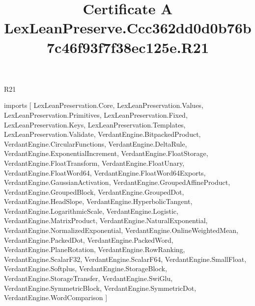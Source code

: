 \begin{lexlean}{R21}
\title{Certificate A LexLeanPreserve.Ccc362dd0d0b76b7c46f93f7f38ec125e.R21}
\begin{coremodule}
imports [
  LexLeanPreservation.Core,
  LexLeanPreservation.Values,
  LexLeanPreservation.Primitives,
  LexLeanPreservation.Fixed,
  LexLeanPreservation.Keys,
  LexLeanPreservation.Templates,
  LexLeanPreservation.Validate,
  VerdantEngine.BitpackedProduct,
  VerdantEngine.CircularFunctions,
  VerdantEngine.DeltaRule,
  VerdantEngine.ExponentialIncrement,
  VerdantEngine.FloatStorage,
  VerdantEngine.FloatTransform,
  VerdantEngine.FloatUnary,
  VerdantEngine.FloatWord64,
  VerdantEngine.FloatWord64Exports,
  VerdantEngine.GaussianActivation,
  VerdantEngine.GroupedAffineProduct,
  VerdantEngine.GroupedBlock,
  VerdantEngine.GroupedDot,
  VerdantEngine.HeadSlope,
  VerdantEngine.HyperbolicTangent,
  VerdantEngine.LogarithmicScale,
  VerdantEngine.Logistic,
  VerdantEngine.MatrixProduct,
  VerdantEngine.NaturalExponential,
  VerdantEngine.NormalizedExponential,
  VerdantEngine.OnlineWeightedMean,
  VerdantEngine.PackedDot,
  VerdantEngine.PackedWord,
  VerdantEngine.PlaneRotation,
  VerdantEngine.RowRanking,
  VerdantEngine.ScalarF32,
  VerdantEngine.ScalarF64,
  VerdantEngine.SmallFloat,
  VerdantEngine.Softplus,
  VerdantEngine.StorageBlock,
  VerdantEngine.StorageTransfer,
  VerdantEngine.SwiGlu,
  VerdantEngine.SymmetricBlock,
  VerdantEngine.SymmetricDot,
  VerdantEngine.WordComparison
]


\end{coremodule}
\end{lexlean}
